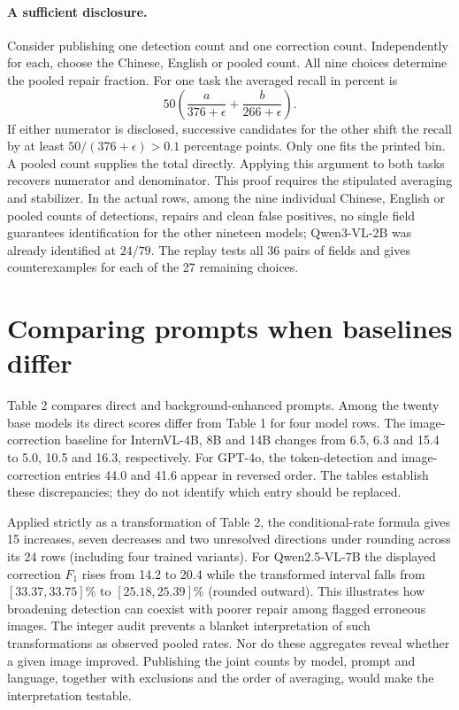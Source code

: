 \documentclass[11pt]{article}
\begin{document}
\paragraph{A sufficient disclosure.} Consider publishing one detection count and one correction count. Independently for each, choose the Chinese, English or pooled count. All nine choices determine the pooled repair fraction. For one task the averaged recall in percent is
\[
 50\left(\frac{a}{376+\epsilon}+\frac{b}{266+\epsilon}\right).
\]
If either numerator is disclosed, successive candidates for the other shift the recall by at least $50/(376+\epsilon)>0.1$ percentage points. Only one fits the printed bin. A pooled count supplies the total directly. Applying this argument to both tasks recovers numerator and denominator. This proof requires the stipulated averaging and stabilizer. In the actual rows, among the nine individual Chinese, English or pooled counts of detections, repairs and clean false positives, no single field guarantees identification for the other nineteen models; Qwen3-VL-2B was already identified at $24/79$. The replay tests all 36 pairs of fields and gives counterexamples for each of the 27 remaining choices.

\section{Comparing prompts when baselines differ}
Table 2 compares direct and background-enhanced prompts. Among the twenty base models its direct scores differ from Table 1 for four model rows. The image-correction baseline for InternVL-4B, 8B and 14B changes from 6.5, 6.3 and 15.4 to 5.0, 10.5 and 16.3, respectively. For GPT-4o, the token-detection and image-correction entries 44.0 and 41.6 appear in reversed order. The tables establish these discrepancies; they do not identify which entry should be replaced.

Applied strictly as a transformation of Table 2, the conditional-rate formula gives 15 increases, seven decreases and two unresolved directions under rounding across its 24 rows (including four trained variants). For Qwen2.5-VL-7B the displayed correction $F_1$ rises from 14.2 to 20.4 while the transformed interval falls from $[33.37,33.75]\%$ to $[25.18,25.39]\%$ (rounded outward). This illustrates how broadening detection can coexist with poorer repair among flagged erroneous images. The integer audit prevents a blanket interpretation of such transformations as observed pooled rates. Nor do these aggregates reveal whether a given image improved. Publishing the joint counts by model, prompt and language, together with exclusions and the order of averaging, would make the interpretation testable.
\end{document}
